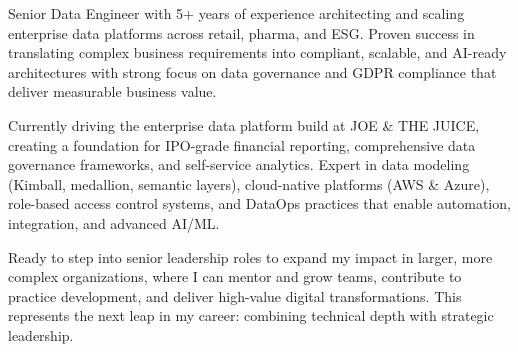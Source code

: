 

\begin{cvparagraph}

Senior Data Engineer with 5+ years of experience architecting and scaling enterprise data platforms across retail, pharma, and ESG. Proven success in translating complex business requirements into compliant, scalable, and AI-ready architectures with strong focus on data governance and GDPR compliance that deliver measurable business value.

Currently driving the enterprise data platform build at JOE \& THE JUICE, creating a foundation for IPO-grade financial reporting, comprehensive data governance frameworks, and self-service analytics. Expert in data modeling (Kimball, medallion, semantic layers), cloud-native platforms (AWS \& Azure), role-based access control systems, and DataOps practices that enable automation, integration, and advanced AI/ML.

Ready to step into senior leadership roles to expand my impact in larger, more complex organizations, where I can mentor and grow teams, contribute to practice development, and deliver high-value digital transformations. This represents the next leap in my career: combining technical depth with strategic leadership.
\end{cvparagraph}
